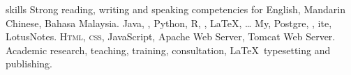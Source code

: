 
\begin{rubric}{skills}
	Strong reading, writing and speaking competencies for English, Mandarin Chinese, Bahasa Malaysia.
	Java, , Python, R, , \LaTeX, \ldots
{}
	My, Postgre, , ite, LotusNotes.
	\textsc{Html, css}, JavaScript, Apache Web Server, Tomcat Web Server.
	Academic research, teaching, training, consultation, \LaTeX\ typesetting and publishing.
\end{rubric}
